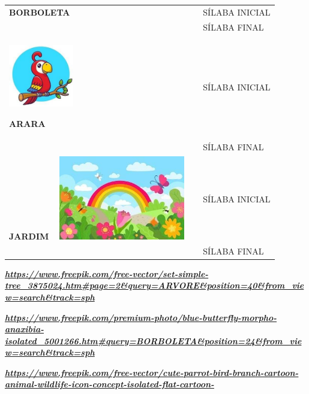\begin{escola}
\begin{longtable}[]{@{}ll@{}}
\begin{minipage}[t]{0.48\columnwidth}
\textbf{BORBOLETA}\strut
\end{minipage} & \begin{minipage}[t]{0.48\columnwidth}\raggedright\strut
SÍLABA INICIAL\strut
\end{minipage}\tabularnewline
& SÍLABA FINAL\tabularnewline
\begin{minipage}[t]{0.48\columnwidth}\raggedright\strut
\includegraphics[width=1.11458in,height=1.08403in]{media/image112.jpg}

\textbf{ARARA}\strut
\end{minipage} & \begin{minipage}[t]{0.48\columnwidth}\raggedright\strut
SÍLABA INICIAL\strut
\end{minipage}\tabularnewline
& SÍLABA FINAL\tabularnewline
\textbf{JARDIM}\includegraphics[width=2.53125in,height=1.44792in]{media/image113.jpg}
& SÍLABA INICIAL\tabularnewline
& SÍLABA FINAL\tabularnewline
\bottomrule
\end{longtable}

\href{https://www.freepik.com/free-vector/set-simple-tree_3875024.htm\#page=2\&query=ARVORE\&position=40\&from_view=search\&track=sph}{\textbf{\emph{https://www.freepik.com/free-vector/set-simple-tree\_3875024.htm\#page=2\&query=ARVORE\&position=40\&from\_view=search\&track=sph}}}

\href{https://www.freepik.com/premium-photo/blue-butterfly-morpho-anaxibia-isolated_5001266.htm\#query=BORBOLETA\&position=24\&from_view=search\&track=sph}{\textbf{\emph{https://www.freepik.com/premium-photo/blue-butterfly-morpho-anaxibia-isolated\_5001266.htm\#query=BORBOLETA\&position=24\&from\_view=search\&track=sph}}}

\href{https://www.freepik.com/free-vector/cute-parrot-bird-branch-cartoon-animal-wildlife-icon-concept-isolated-flat-cartoon-}{\textbf{\emph{https://www.freepik.com/free-vector/cute-parrot-bird-branch-cartoon-animal-wildlife-icon-concept-isolated-flat-cartoon-}}}\protect\hypertarget{_heading=h.hanzzj3wwcdx}{}{\protect\hypertarget{_heading=h.bw5gy3j8k2c7}{}{}}


\end{escola}
